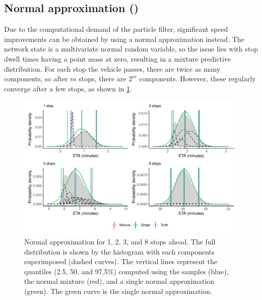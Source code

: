 \subsection[Normal approximation]{Normal approximation (\Fnorm{})}
\label{sec:prediction_arrival_time_normal}

Due to the computational demand of the particle filter, significant speed improvements can be obtained by using a normal approximation instead. The network state is a multivariate normal random variable, so the issue lies with stop dwell times having a point mass at zero, resulting in a mixture predictive distribution. For each stop the vehicle passes, there are twice as many components, so after $m$ stops, there are $2^m$ components. However, these regularly converge after a few stops, as shown in \cref{fig:normal_approx}.

\begin{knitrout}\small
{}\color{fgcolor}\begin{figure}

{\centering \includegraphics[width=\textwidth]{figure/normal_approx-1} 

}

\caption[Normal approximation for 1, 2, 3, and 8 stops ahead]{Normal approximation for 1, 2, 3, and 8 stops ahead. The full distribution is shown by the histogram with each components superimposed (dashed curves). The vertical lines represent the quantiles (2.5, 50, and 97.5\%) computed using the samples (blue), the normal mixture (red), and a single normal approximation (green). The green curve is the single normal approximation.}\label{fig:normal_approx}
\end{figure}


\end{knitrout}

